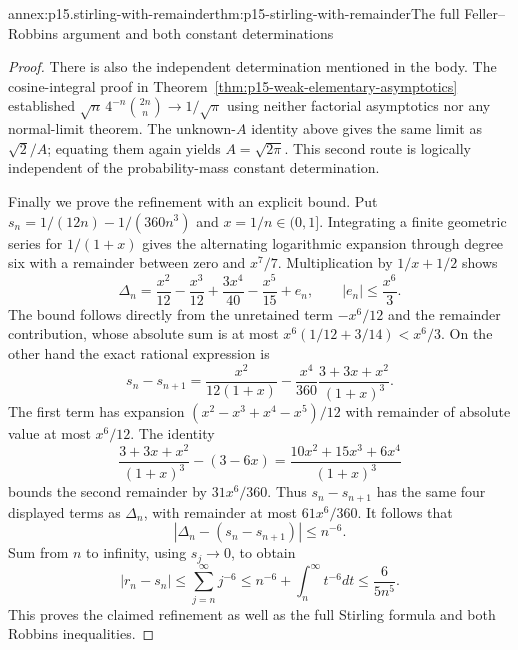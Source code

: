 \begin{annexitem}{annex:p15.stirling-with-remainder}{thm:p15-stirling-with-remainder}{The full Feller--Robbins argument and both constant determinations}
\begin{proof}
There is also the independent determination mentioned in
the body. The cosine-integral proof in
Theorem~\ref{thm:p15-weak-elementary-asymptotics}
established \(\sqrt n\,4^{-n}\binom{2n}{n}\to1/\sqrt\pi\)
using neither factorial asymptotics nor any normal-limit
theorem. The unknown-\(A\) identity above gives the same
limit as \(\sqrt2/A\); equating them again yields
\(A=\sqrt{2\pi}\). This second route is logically independent
of the probability-mass constant determination.

Finally we prove the refinement with an explicit bound.
Put \(s_n=1/(12n)-1/(360n^3)\) and \(x=1/n\in(0,1]\).
Integrating a finite geometric series for \(1/(1+x)\)
gives the alternating logarithmic expansion through degree
six with a remainder between zero and \(x^7/7\).
Multiplication by \(1/x+1/2\) shows
\[
 \Delta_n=
 \frac{x^2}{12}-\frac{x^3}{12}
       +\frac{3x^4}{40}-\frac{x^5}{15}+e_n,\qquad
 |e_n|\leq\frac{x^6}{3}.
\]
The bound follows directly from the unretained term
\(-x^6/12\) and the remainder contribution, whose absolute
sum is at most \(x^6(1/12+3/14)<x^6/3\).
On the other hand the exact rational expression is
\[
 s_n-s_{n+1}
  =\frac{x^2}{12(1+x)}
       -\frac{x^4}{360}\frac{3+3x+x^2}{(1+x)^3}.
\]
The first term has expansion
\((x^2-x^3+x^4-x^5)/12\) with remainder of absolute
value at most \(x^6/12\). The identity
\[
 \frac{3+3x+x^2}{(1+x)^3}-(3-6x)
             =\frac{10x^2+15x^3+6x^4}{(1+x)^3}
\]
bounds the second remainder by \(31x^6/360\).
Thus \(s_n-s_{n+1}\) has the same four displayed terms
as \(\Delta_n\), with remainder at most \(61x^6/360\).
It follows that
\[
 |\Delta_n-(s_n-s_{n+1})|\leq n^{-6}.
\]
Sum from \(n\) to infinity, using \(s_j\to0\), to obtain
\[
 |r_n-s_n|\leq\sum_{j=n}^\infty j^{-6}
       \leq n^{-6}+\int_n^\infty t^{-6}dt
       \leq\frac6{5n^5}.
\]
This proves the claimed refinement as well as the full
Stirling formula and both Robbins inequalities.
\end{proof}
\end{annexitem}

